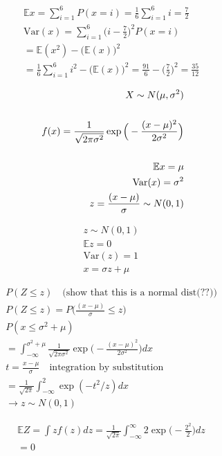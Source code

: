 \documentclass[10pt]{article}
\begin{document}
\hfill 

\begin{align*}
    \mathbb{E}x = \sum_{i = 1}^{6}P(x = i) = \frac{1}{6} \sum_{i = 1}^{6}i = \frac{7}{2} \\
    \text{Var}(x) = \sum_{i = 1}^{6}\Big(i - \frac{7}{2}\Big)^2 P(x = i) \\
    = \mathbb{E}(x^2) - \big(\mathbb{E}(x)\big)^2 \\ 
    = \frac{1}{6} \sum_{i = 1}^{6}i^2 - \big(\mathbb{E}(x)\big)^2 = \frac{91}{6} - \Big(\frac{7}{2}\Big)^2 = \frac{35}{12}
\end{align*}


\begin{align*}
    X \sim N(\mu, \sigma^2) \\
    \hfill \\ 
    f(x) = \frac{1}{\sqrt{2\pi \sigma^2}}\exp \Big(-\frac{(x - \mu)^2}{2\sigma^2}\Big) \\
    \hfill \\ 
    \mathbb{E}x = \mu \\ 
    \text{Var}(x) = \sigma^2 \\
    z = \frac{(x - \mu)}{\sigma} \sim N(0, 1)
\end{align*}

\begin{align*}
    z \sim N(0, 1) \\
    \mathbb{E}z = 0 \\
    \text{Var}(z) = 1 \\
    x = \sigma z + \mu
\end{align*}

\begin{align*}
    P(Z \leq z) \quad\text{(show that this is a normal dist(??))} \\ 
    P(Z \leq z) = P\Big(\frac{(x - \mu)}{\sigma} \leq z\Big) \\
    P(x \leq \sigma^2 + \mu) \\ 
    =\int_{-\infty}^{\sigma^2 + \mu} \frac{1}{\sqrt{2\pi \sigma^2}}\exp \Big(-\frac{(x - \mu)^2}{2\sigma^2}\Big) dx \\
    t = \frac{x - \mu}{\sigma}\quad\text{integration by substitution} \\ 
    = \frac{1}{\sqrt{2\pi}} \int_{-\infty}^{2} \exp (-t^2 / z) dx \\
    \to z \sim N(0, 1)
\end{align*}

\begin{align*}
    \mathbb{E}Z= \int z f(z) dz = \frac{1}{\sqrt{2\pi}} \int_{-\infty}^{\infty} 2 \exp \Big(-\frac{2^2}{2}\Big) dz\\
    = 0
\end{align*}
\end{document}
